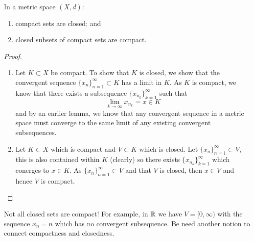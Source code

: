 \begin{corollary}
    In a metric space $(X, d)$:
    \begin{enumerate}
        \item compact sets are closed; and
        \item closed subsets of compact sets are compact.
    \end{enumerate}
\end{corollary}

\begin{proof}
    \begin{enumerate}
        \item Let $K \subset X$ be compact. To show that $K$ is closed, we show that the convergent sequence $\{x_n\}_{n = 1}^{\infty} \subset K$ has a limit in $K$. As $K$ is compact, we know that there exists a subsequence $\{x_{n_k}\}_{k = 1}^{\infty}$ such that
            \[ \lim_{k \to \infty} x_{n_k} = x \in K \]
            and by an earlier lemma, we know that any convergent sequence in a metric space must converge to the same limit of any existing convergent subsequences.
            
        \item Let $K \subset X$ which is compact and $V \subset K$ which is closed. Let $\{ x_n \}_{n = 1}^{\infty} \subset V$, this is also contained within $K$ (clearly) so there exists $\{ x_{n_k}\}_{k = 1}^\infty$ which conerges to $x \in K$. As $\{x_n\}_{n = 1}^\infty \subset V$ and that $V$ is closed, then $x \in V$ and hence $V$ is compact.
    \end{enumerate}
\end{proof}

\begin{remark}
    Not all closed sets are compact! For example, in $\mathbb{R}$ we have $V = [0, \infty)$ with the sequence $x_n = n$ which has no convergent subsequence. Be need another notion to connect compactness and closedness.
\end{remark}
